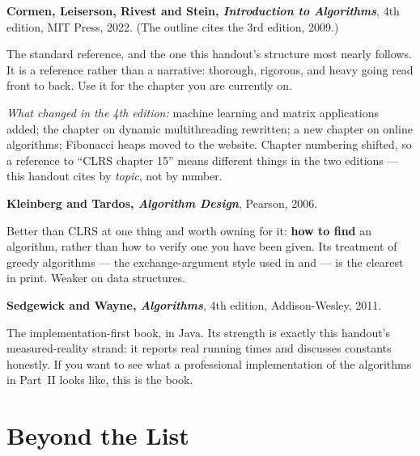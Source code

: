 \begin{conceptbox}
\textbf{Cormen, Leiserson, Rivest and Stein, \emph{Introduction to
Algorithms}}, 4th edition, MIT Press, 2022. (The outline cites the 3rd
edition, 2009.)

\smallskip
The standard reference, and the one this handout's structure most nearly
follows. It is a reference rather than a narrative: thorough, rigorous, and
heavy going read front to back. Use it for the chapter you are currently on.

\smallskip
\emph{What changed in the 4th edition:} machine learning and matrix
applications added; the chapter on dynamic multithreading rewritten; a new
chapter on online algorithms; Fibonacci heaps moved to the website. Chapter
numbering shifted, so a reference to ``CLRS chapter 15'' means different things
in the two editions --- this handout cites by \emph{topic}, not by number.

\medskip
\textbf{Kleinberg and Tardos, \emph{Algorithm Design}}, Pearson, 2006.

\smallskip
Better than CLRS at one thing and worth owning for it: \textbf{how to find} an
algorithm, rather than how to verify one you have been given. Its treatment of
greedy algorithms --- the exchange-argument style used in  and
 --- is the clearest in print. Weaker on data structures.

\medskip
\textbf{Sedgewick and Wayne, \emph{Algorithms}}, 4th edition,
Addison-Wesley, 2011.

\smallskip
The implementation-first book, in Java. Its strength is exactly this handout's
measured-reality strand: it reports real running times and discusses constants
honestly. If you want to see what a professional implementation of the
algorithms in Part~II looks like, this is the book.
\end{conceptbox}

\section{Beyond the List}

